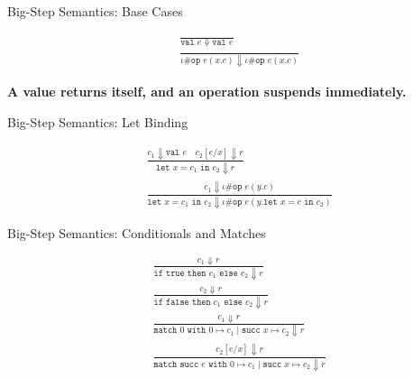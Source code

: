 \begin{frame}{Big-Step Semantics: Base Cases}

\begin{align*}
&\frac{}{\texttt{val } e \Downarrow \texttt{val } e} \\
&\frac{}{\iota \# \texttt{op } e (x. c) \Downarrow \iota \# \texttt{op } e (x. c)}
\end{align*}

\vspace{1em}
\textbf{A value returns itself, and an operation suspends immediately.}
\end{frame}

\begin{frame}{Big-Step Semantics: Let Binding}

\begin{align*}
&\frac{c_1 \Downarrow \texttt{val } e \quad c_2[e/x] \Downarrow r}
{\texttt{let } x = c_1 \texttt{ in } c_2 \Downarrow r}
\\[1em]
&\frac{c_1 \Downarrow \iota \# \texttt{op } e (y. c)}
{\texttt{let } x = c_1 \texttt{ in } c_2 \Downarrow \iota \# \texttt{op } e (y. \texttt{let } x = c \texttt{ in } c_2)}
\end{align*}
\end{frame}

\begin{frame}{Big-Step Semantics: Conditionals and Matches}

\begin{align*}
&\frac{c_1 \Downarrow r}
{\texttt{if true then } c_1 \texttt{ else } c_2 \Downarrow r}
\\
&\frac{c_2 \Downarrow r}
{\texttt{if false then } c_1 \texttt{ else } c_2 \Downarrow r}
\\[1em]
&\frac{c_1 \Downarrow r}
{\texttt{match } 0 \texttt{ with } 0 \mapsto c_1 \mid \texttt{succ } x \mapsto c_2 \Downarrow r}
\\
&\frac{c_2[e/x] \Downarrow r}
{\texttt{match succ } e \texttt{ with } 0 \mapsto c_1 \mid \texttt{succ } x \mapsto c_2 \Downarrow r}
\end{align*}
\end{frame}

